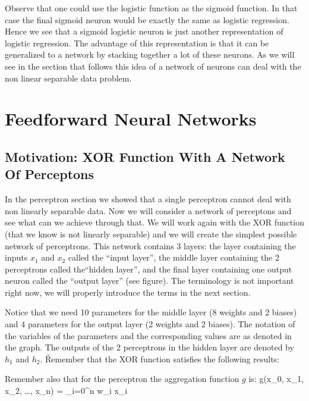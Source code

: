 Observe that one could use the logistic function as the sigmoid function. In that case the final sigmoid neuron would
be exactly the same as logistic regression. Hence we see that a sigmoid logistic neuron is just another
representation of logistic regression. The advantage of this representation is that it can be generalized to a
network by stacking together a lot of these neurons. As we will see in the section that follows this idea of a
network of neurons can deal with the non linear separable data problem.

\section{Feedforward Neural Networks}

\subsection{Motivation: XOR Function With A Network Of Perceptons}

In the perceptron section we showed that a single perceptron cannot deal with non linearly separable data. Now we
will consider a network of perceptons and see what can we achieve through that. We will work again with the XOR
function (that we know is not linearly separable) and we will create the simplest possible network of perceptrons.
This network contains 3 layers: the layer containing the inputs $x_1$ and $x_2$ called the ``input layer'', the
middle layer containing the 2 perceptrons called the``hidden layer'', and the final layer containing one output
neuron called the ``output layer'' (see figure). The terminology is not important right now, we will properly
introduce the terms in the next section.


Notice that we need 10 parameters for the middle layer (8 weights and 2 biases) and 4 parameters for the output layer
(2 weights and 2 biases). The notation of the variables of the parameters and the corresponding values are as denoted
in the graph. The outputs of the 2 perceptrons in the hidden layer are denoted by $h_1$ and $h_2$. \v

Remember that the XOR function satisfies the following results:


\vspace{-5pt}

Remember also that for the perceptron the aggregation function $g$ is:
\bse
g(x_0, x_1, x_2, \ldots, x_n) = \sum_{i=0}^{n} w_i x_i
\ese

